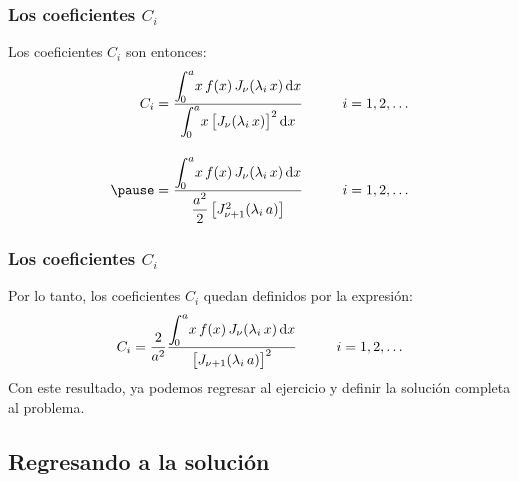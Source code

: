 \documentclass[12pt]{beamer}
\begin{document}
\begin{frame}
\frametitle{Los coeficientes $C_{i}$}
Los coeficientes $C_{i}$ son entonces:
\pause
\begin{eqnarray*}
\begin{aligned}
C_{i} &= \dfrac{\scaleint{5ex}_{\bs 0}^{a} x \, f(x) \, J_{\nu}(\lambda_{i} \, x) \dd{x}}{\scaleint{5ex}_{\bs 0}^{a} x \, \big[ J_{\nu} (\lambda_{i} \, x) \big]^{2} \dd{x}} \hspace{1cm} i = 1, 2, \ldots \\[1em] \pause
&= \dfrac{\scaleint{5ex}_{\bs 0}^{a} x \, f(x) \, J_{\nu}(\lambda_{i} \, x) \dd{x}}{\dfrac{a^{2}}{2} \, \big[ J_{\nu+1}^{2} (\lambda_{i} \, a) \big]} \hspace{1cm} i = 1, 2, \ldots
\end{aligned}
\end{eqnarray*}
\end{frame}
\begin{frame}
\frametitle{Los coeficientes $C_{i}$}
Por lo tanto, los coeficientes $C_{i}$ quedan definidos por la expresión:
\pause
\begin{align*}
C_{i} = \dfrac{2}{a^{2}} \dfrac{\scaleint{5ex}_{\bs 0}^{a} x \, f(x) \, J_{\nu}(\lambda_{i} \, x) \dd{x}}{ \big[ J_{\nu+1} (\lambda_{i} \, a) \big]^{2}} \hspace{1cm} i = 1, 2, \ldots
\end{align*}
\pause
Con este resultado, ya podemos regresar al ejercicio y definir la solución completa al problema.
\end{frame}

\subsection*{Regresando a la solución}
\end{document}
